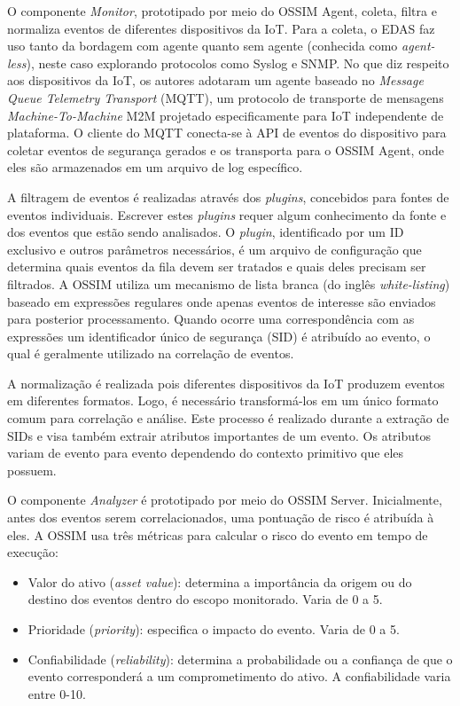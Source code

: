 \documentclass[tid,table]{texufpel} %
\begin{document}
O componente \textit{Monitor}, prototipado por meio do OSSIM Agent, coleta, filtra e normaliza eventos de diferentes dispositivos da IoT. Para a coleta, o EDAS faz uso tanto da bordagem com agente quanto sem agente (conhecida como \textit{agent-less}), neste caso explorando protocolos como Syslog e SNMP. No que diz respeito aos dispositivos da IoT, os autores adotaram um agente baseado no \textit{Message Queue Telemetry Transport} (MQTT), um protocolo de transporte de mensagens \textit{Machine-To-Machine} M2M projetado especificamente para IoT independente de plataforma. O cliente do MQTT conecta-se à API de eventos do dispositivo para coletar eventos de segurança gerados e os transporta para o OSSIM Agent, onde eles são armazenados em um arquivo de log específico.

A filtragem de eventos é realizadas através dos \textit{plugins}, concebidos para fontes de eventos individuais. Escrever estes \textit{plugins} requer algum conhecimento da fonte e dos eventos que estão sendo analisados. O \textit{plugin}, identificado por um ID exclusivo e outros parâmetros necessários, é um arquivo de configuração que determina quais eventos da fila devem ser tratados e quais deles precisam ser filtrados. A OSSIM utiliza um mecanismo de lista branca (do inglês \textit{white-listing}) baseado em expressões regulares onde apenas eventos de interesse são enviados para posterior processamento. Quando ocorre uma correspondência com as expressões um identificador único de segurança (SID) é atribuído ao evento, o qual é geralmente utilizado na correlação de eventos.

A normalização é realizada pois diferentes dispositivos da IoT produzem eventos em diferentes formatos. Logo, é necessário transformá-los em um único formato comum para correlação e análise. Este processo é realizado durante a extração de SIDs e visa também extrair atributos importantes de um evento. Os atributos variam de evento para evento dependendo do contexto primitivo que eles possuem.

O componente \textit{Analyzer} é prototipado por meio do OSSIM Server. Inicialmente, antes dos eventos serem correlacionados, uma pontuação de risco é atribuída à eles. A OSSIM usa três métricas para calcular o risco do evento em tempo de execução:

\begin{itemize}
\item Valor do ativo (\textit{asset value}): determina a importância da origem ou do destino dos eventos dentro do escopo monitorado. Varia de 0 a 5.
\item Prioridade (\textit{priority}): especifica o impacto do evento. Varia de 0 a 5.
\item Confiabilidade (\textit{reliability}): determina a probabilidade ou a confiança de que o evento corresponderá a um comprometimento do ativo. A confiabilidade varia entre 0-10.

\end{itemize}
\end{document}
